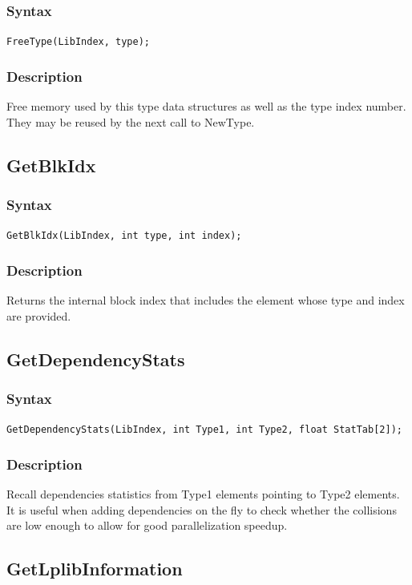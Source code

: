 \documentclass[a4paper,12pt]{article}
\begin{document}
\subsubsection*{Syntax}
\tt{FreeType(LibIndex, type);}
\normalfont

\subsubsection*{Description}
Free memory used by this type data structures as well as the type index number. They may be reused by the next call to NewType.


\subsection{GetBlkIdx}

\subsubsection*{Syntax}
\tt{GetBlkIdx(LibIndex, int type, int index);}
\normalfont

\subsubsection*{Description}
Returns the internal block index that includes the element whose type and index are provided.


\subsection{GetDependencyStats}

\subsubsection*{Syntax}
\tt{GetDependencyStats(LibIndex, int Type1, int Type2, float StatTab[2]);}
\normalfont

\subsubsection*{Description}
Recall dependencies statistics from Type1 elements pointing to Type2 elements. It is useful when adding dependencies on the fly to check whether the collisions are low enough to allow for good parallelization speedup.


\subsection{GetLplibInformation}
\end{document}
